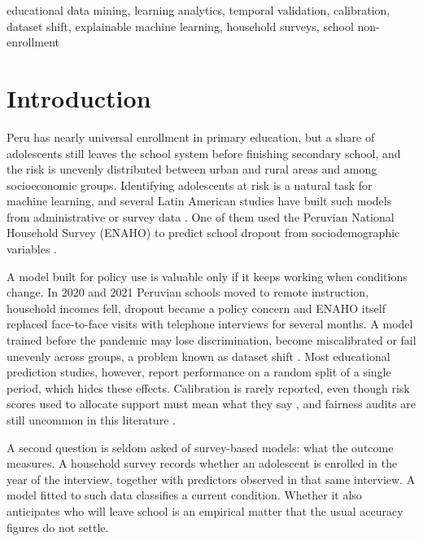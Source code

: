 \documentclass[conference]{IEEEtran}
\begin{document}
\begin{IEEEkeywords}
educational data mining, learning analytics, temporal validation, calibration, dataset shift, explainable machine learning, household surveys, school non-enrollment
\end{IEEEkeywords}

\section{Introduction}

Peru has nearly universal enrollment in primary education, but a share of adolescents still leaves the school system before finishing secondary school, and the risk is unevenly distributed between urban and rural areas and among socioeconomic groups. Identifying adolescents at risk is a natural task for machine learning, and several Latin American studies have built such models from administrative or survey data \cite{rodriguez2023,adelman2018,jacha2024,jimenez2024}. One of them used the Peruvian National Household Survey (ENAHO) to predict school dropout from sociodemographic variables \cite{jacha2024}.

A model built for policy use is valuable only if it keeps working when conditions change. In 2020 and 2021 Peruvian schools moved to remote instruction, household incomes fell, dropout became a policy concern \cite{gallego2025} and ENAHO itself replaced face-to-face visits with telephone interviews for several months. A model trained before the pandemic may lose discrimination, become miscalibrated or fail unevenly across groups, a problem known as dataset shift \cite{moreno2012}. Most educational prediction studies, however, report performance on a random split of a single period, which hides these effects. Calibration is rarely reported, even though risk scores used to allocate support must mean what they say \cite{vancalster2019}, and fairness audits are still uncommon in this literature \cite{baker2022}.

A second question is seldom asked of survey-based models: what the outcome measures. A household survey records whether an adolescent is enrolled in the year of the interview, together with predictors observed in that same interview. A model fitted to such data classifies a current condition. Whether it also anticipates who will leave school is an empirical matter that the usual accuracy figures do not settle.
\end{document}

